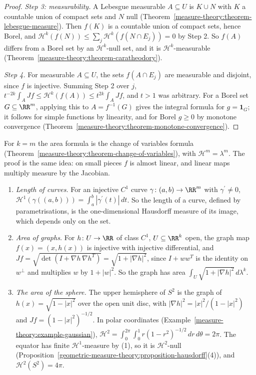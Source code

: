 \begin{proof}
\emph{Step 3: measurability.} A Lebesgue measurable $A \subseteq U$ is $K \cup N$ with $K$ a countable union of compact sets and $N$ null (Theorem~\ref{measure-theory:theorem-lebesgue-measure}).
Then $f(K)$ is a countable union of compact sets, hence Borel, and $\mathcal{H}^k(f(N)) \leq \sum_j\mathcal{H}^k(f(N \cap E_j)) = 0$ by Step 2. So $f(A)$ differs from a Borel set by an
$\mathcal{H}^k$-null set, and it is $\mathcal{H}^k$-measurable (Theorem~\ref{measure-theory:theorem-caratheodory}).

\emph{Step 4.} For measurable $A \subseteq U$, the sets $f(A \cap E_j)$ are measurable and disjoint, since $f$ is injective. Summing Step 2 over $j$,
$t^{-2k}\int_AJf \leq \mathcal{H}^k(f(A)) \leq t^{2k}\int_AJf$, and $t > 1$ was arbitrary. For a Borel set $G \subseteq \RR^m$, applying this to $A = f^{-1}(G)$ gives the integral formula for
$g = \mathbf{1}_G$; it follows for simple functions by linearity, and for Borel $g \geq 0$ by monotone convergence (Theorem~\ref{measure-theory:theorem-monotone-convergence}).
\end{proof}

For $k = m$ the area formula is the change of variables formula (Theorem~\ref{measure-theory:theorem-change-of-variables}), with $\mathcal{H}^m = \lambda^m$. The proof is the same idea: on small pieces
$f$ is almost linear, and linear maps multiply measure by the Jacobian.

\begin{example}\label{geometric-measure-theory:example-area-formula}
\begin{enumerate}
\item \emph{Length of curves.} For an injective $C^1$ curve $\gamma \colon (a, b) \to \RR^m$ with $\gamma^{\prime} \neq 0$, $\mathcal{H}^1(\gamma((a, b))) = \int_a^b|\gamma^{\prime}(t)|\,dt$. So the length
of a curve, defined by parametrisations, is the one-dimensional Hausdorff measure of its image, which depends only on the set.
\item \emph{Area of graphs.} For $h \colon U \to \RR$ of class $C^1$, $U \subseteq \RR^k$ open, the graph map $f(x) = (x, h(x))$ is injective with injective differential, and
$Jf = \sqrt{\det(I + \nabla h\,\nabla h^T)} = \sqrt{1 + |\nabla h|^2}$, since $I + ww^T$ is the identity on $w^\perp$ and multiplies $w$ by $1 + |w|^2$. So the graph has area
$\int_U\sqrt{1 + |\nabla h|^2}\,d\lambda^k$.
\item \emph{The area of the sphere.} The upper hemisphere of $S^2$ is the graph of $h(x) = \sqrt{1 - |x|^2}$ over the open unit disc, with $|\nabla h|^2 = |x|^2/(1 - |x|^2)$ and
$Jf = (1 - |x|^2)^{-1/2}$. In polar coordinates (Example~\ref{measure-theory:example-gaussian}), $\mathcal{H}^2 = \int_0^{2\pi}\int_0^1 r(1 - r^2)^{-1/2}\,dr\,d\theta = 2\pi$. The equator has finite $\mathcal{H}^1$-measure by (1), so it is
$\mathcal{H}^2$-null (Proposition~\ref{geometric-measure-theory:proposition-hausdorff}(4)), and $\mathcal{H}^2(S^2) = 4\pi$.
\end{enumerate}
\end{example}

